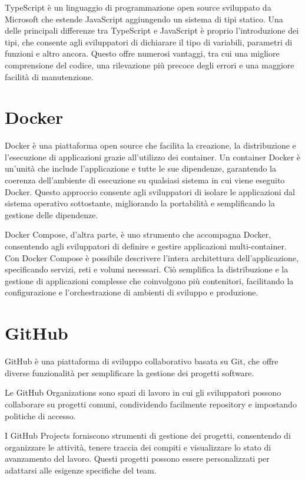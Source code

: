 \documentclass[12pt,a4paper,openright,twoside]{book}
\begin{document}
TypeScript è un linguaggio di programmazione open source sviluppato da Microsoft che estende JavaScript aggiungendo un sistema di tipi statico. Una delle principali differenze tra TypeScript e JavaScript è proprio l'introduzione dei tipi, che consente agli sviluppatori di dichiarare il tipo di variabili, parametri di funzioni e altro ancora. Questo offre numerosi vantaggi, tra cui una migliore comprensione del codice, una rilevazione più precoce degli errori e una maggiore facilità di manutenzione. 

\section{Docker}

Docker è una piattaforma open source che facilita la creazione, la distribuzione e l'esecuzione di applicazioni grazie all'utilizzo dei container. Un container Docker è un'unità che include l'applicazione e tutte le sue dipendenze, garantendo la coerenza dell'ambiente di esecuzione su qualsiasi sistema in cui viene eseguito Docker. Questo approccio consente agli sviluppatori di isolare le applicazioni dal sistema operativo sottostante, migliorando la portabilità e semplificando la gestione delle dipendenze.

Docker Compose, d'altra parte, è uno strumento che accompagna Docker, consentendo agli sviluppatori di definire e gestire applicazioni multi-container. Con Docker Compose è possibile descrivere l'intera architettura dell'applicazione, specificando servizi, reti e volumi necessari. Ciò semplifica la distribuzione e la gestione di applicazioni complesse che coinvolgono più contenitori, facilitando la configurazione e l'orchestrazione di ambienti di sviluppo e produzione.

\section{GitHub}

GitHub è una piattaforma di sviluppo collaborativo basata su Git, che offre diverse funzionalità per semplificare la gestione dei progetti software.

Le GitHub Organizations sono spazi di lavoro in cui gli sviluppatori possono collaborare su progetti comuni, condividendo facilmente repository e impostando politiche di accesso.

I GitHub Projects forniscono strumenti di gestione dei progetti, consentendo di organizzare le attività, tenere traccia dei compiti e visualizzare lo stato di avanzamento del lavoro. Questi progetti possono essere personalizzati per adattarsi alle esigenze specifiche del team.
\end{document}
